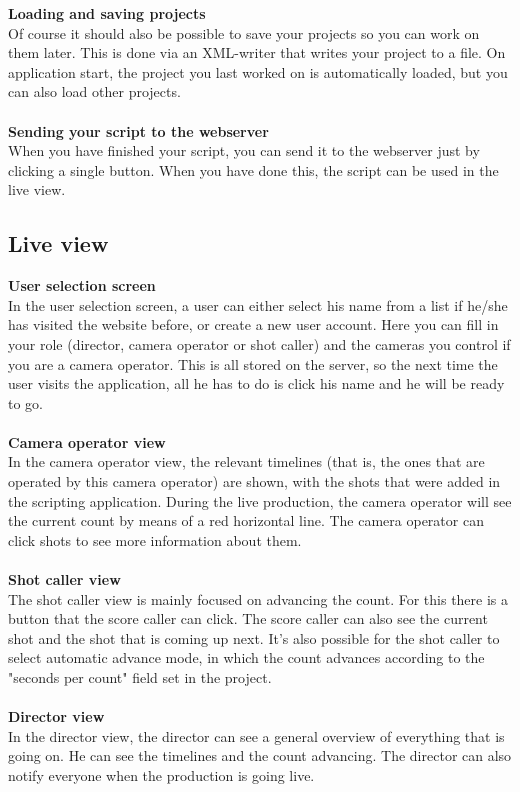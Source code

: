 \textbf{Loading and saving projects}\\
Of course it should also be possible to save your projects so you can work on them later. This is done via an XML-writer that writes your project to a file. On application start, the project you last worked on is automatically loaded, but you can also load other projects.\\\\
\textbf{Sending your script to the webserver}\\
When you have finished your script, you can send it to the webserver just by clicking a single button. When you have done this, the script can be used in the live view.


\subsection*{Live view}
\textbf{User selection screen}\\
In the user selection screen, a user can either select his name from a list if he/she has visited the website before, or create a new user account. Here you can fill in your role (director, camera operator or shot caller) and the cameras you control if you are a camera operator. This is all stored on the server, so the next time the user visits the application, all he has to do is click his name and he will be ready to go.\\\\
\textbf{Camera operator view}\\
In the camera operator view, the relevant timelines (that is, the ones that are operated by this camera operator) are shown, with the shots that were added in the scripting application. During the live production, the camera operator will see the current count by means of a red horizontal line. The camera operator can click shots to see more information about them.\\\\
\textbf{Shot caller view}\\
The shot caller view is mainly focused on advancing the count. For this there is a button that the score caller can click. The score caller can also see the current shot and the shot that is coming up next. It's also possible for the shot caller to select automatic advance mode, in which the count advances according to the "seconds per count" field set in the project.\\\\
\textbf{Director view}\\
In the director view, the director can see a general overview of everything that is going on. He can see the timelines and the count advancing. The director can also notify everyone when the production is going live.\\\\

